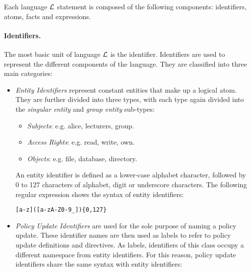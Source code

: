 \documentclass[glov2,twocolumn,final]{svjour2}
\newenvironment{vverbatim}
  {\begin{alltt}}
  {\vspace{-\baselineskip}\end{alltt}}
\begin{document}
        Each language ${\cal L}$ statement is composed of the following
        components: identifiers, atoms, facts and expressions.

        \paragraph{Identifiers.}
          The most basic unit of language $\cal{L}$ is the identifier.
          Identifiers are used to represent the different components of the
          language. They are classified into three main categories:

          \begin{itemize}
            \item
              {\em Entity Identifiers} represent constant entities that make up
              a logical atom. They are further divided into three types, with
              each type again divided into the {\em singular entity} and
              {\em group entity} sub-types:

              \begin{itemize}
                \item
                  {\em Subjects}: e.g. alice, lecturers, group.
                \item
                  {\em Access Rights}: e.g. read, write, own.
                \item
                  {\em Objects}: e.g. file, database, directory.
              \end{itemize}

              An entity identifier is defined as a lower-case alphabet
              character, followed by 0 to 127 characters of alphabet, digit or
              underscore characters. The following regular expression shows the
              syntax of entity identifiers:

              \begin{vverbatim}
  [a-z]([a-zA-Z0-9\_])\{0,127\}
              \end{vverbatim}

            \item
              {\em Policy Update Identifiers} are used for the sole purpose of
              naming a policy update. These identifier names are then used as
              labels to refer to policy update definitions and directives. As
              labels, identifiers of this class occupy a different namespace
              from entity identifiers. For this reason, policy update
              identifiers share the same syntax with entity identifiers:



\end{itemize}
\end{document}
